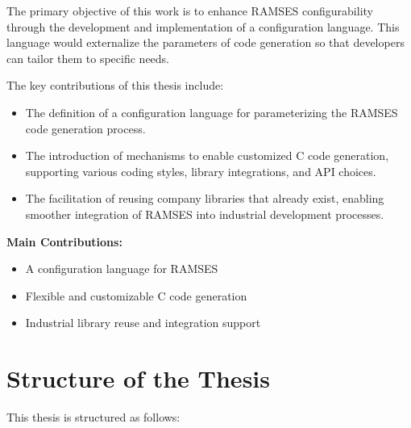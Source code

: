 The primary objective of this work is to enhance \gls{RAMSES} configurability through the development and implementation of a configuration language. This language would externalize the parameters of code generation so that developers can tailor them to specific needs.

The key contributions of this thesis include:
\begin{itemize}
	\item The definition of a configuration language for parameterizing the \gls{RAMSES} code generation process.
	\item The introduction of mechanisms to enable customized C code generation, supporting various coding styles, library integrations, and \gls{API} choices.
	\item The facilitation of reusing company libraries that already exist, enabling smoother integration of \gls{RAMSES} into industrial development processes.
\end{itemize}

\begin{tcolorbox}[colback=blue!5]
	\textbf{Main Contributions:}
	\begin{itemize}
		\item A configuration language for \gls{RAMSES}
		\item Flexible and customizable C code generation
		\item Industrial library reuse and integration support
	\end{itemize}
\end{tcolorbox}



\section{Structure of the Thesis}

This thesis is structured as follows:

